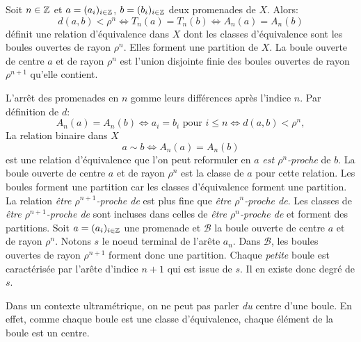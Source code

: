 \begin{propn}\label{Prop:PromEquiv}
 Soit $n\in \mathbb{Z}$ et $a = (a_i)_{i \in \mathbb{Z}}$, $b = (b_i)_{i \in \mathbb{Z}}$ deux promenades de $X$. Alors:
 \begin{displaymath}
   d(a,b) < \rho^n  \Leftrightarrow T_n(a) = T_n(b) \Leftrightarrow A_n(a) = A_n(b)
 \end{displaymath}
 définit une relation d'équivalence dans $X$ dont les classes d'équivalence sont les boules ouvertes de rayon $\rho^n$. Elles forment une partition de $X$.\newline
 La boule ouverte de centre $a$ et de rayon $\rho^n$ est l'union disjointe finie des boules ouvertes de rayon $\rho^{n+1}$ qu'elle contient.
\end{propn}
\begin{demo}
L'arrêt des promenades en $n$ gomme leurs différences après l'indice $n$. Par définition de $d$:
 \begin{displaymath}
  A_n(a) = A_n(b) \Leftrightarrow a_i = b_i \text{ pour } i \leq n \Leftrightarrow d(a,b) < \rho^n,
 \end{displaymath}
La relation binaire dans $X$
\begin{displaymath}
 a \sim b \Leftrightarrow A_n(a) = A_n(b)
\end{displaymath}
est une relation d'équivalence que l'on peut reformuler en $a$ \emph{est $\rho^n$-proche} de $b$. La boule ouverte de centre $a$ et de rayon $\rho^n$ est la classe de $a$ pour cette relation.\newline
Les boules forment une partition car les classes d'équivalence forment une partition.\newline
La relation \og\emph{être $\rho^{n+1}$-proche de}\fg{} est plus fine que \og\emph{être $\rho^{n}$-proche de}\fg. Les classes de \og\emph{être $\rho^{n+1}$-proche de}\fg{} sont incluses dans celles de \og\emph{être $\rho^{n}$-proche de}\fg{} et forment des partitions.\newline
Soit $a = (a_i)_{i \in \mathbb{Z}}$ une promenade et $\mathcal{B}$ la boule ouverte de centre $a$ et de rayon $\rho^n$. Notons $s$ le noeud terminal de l'arête $a_n$. Dans $\mathcal{B}$, les boules ouvertes de rayon $\rho^{n+1}$ forment donc une partition. Chaque \emph{petite} boule est caractérisée par l'arête d'indice $n+1$ qui est issue de $s$. Il en existe donc degré de $s$.
\end{demo}
\begin{rem}
 Dans un contexte ultramétrique, on ne peut pas parler \emph{du} centre d'une boule. En effet, comme chaque boule est une classe d'équivalence, chaque élément de la boule est un centre.
\end{rem}

